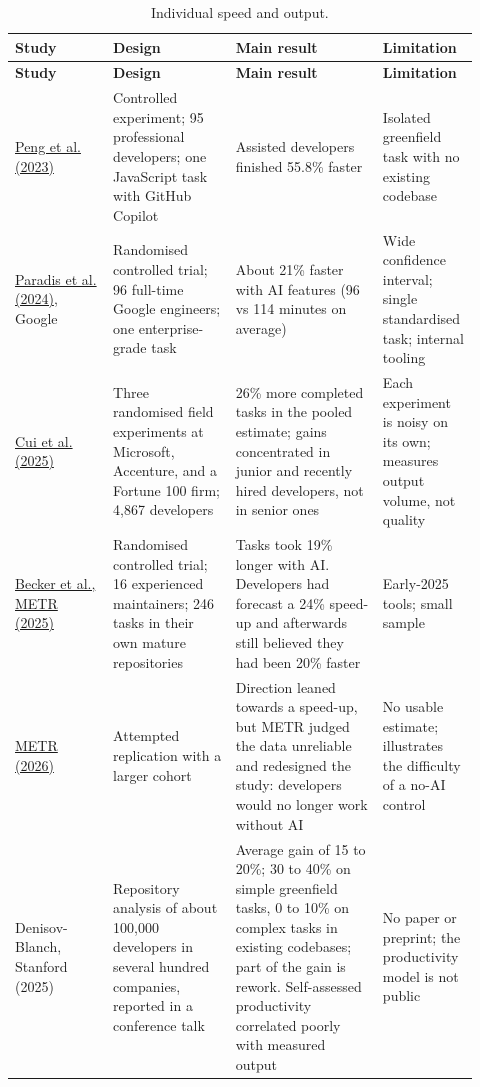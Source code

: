 \documentclass[11pt]{article}
\begin{document}
\small
\begin{longtable}{p{0.2\linewidth}p{0.25\linewidth}p{0.3\linewidth}p{0.17\linewidth}}
\caption{Individual speed and output.}\\
\toprule
\textbf{Study} & \textbf{Design} & \textbf{Main result} & \textbf{Limitation} \\
\midrule
\endfirsthead
\toprule
\textbf{Study} & \textbf{Design} & \textbf{Main result} & \textbf{Limitation} \\
\midrule
\endhead
\href{https://arxiv.org/abs/2302.06590}{Peng et al. (2023)} & Controlled experiment; 95 professional developers; one JavaScript task with GitHub Copilot & Assisted developers finished 55.8\% faster & Isolated greenfield task with no existing codebase \\
\href{https://arxiv.org/pdf/2410.12944}{Paradis et al. (2024)}, Google & Randomised controlled trial; 96 full-time Google engineers; one enterprise-grade task & About 21\% faster with AI features (96 vs 114 minutes on average) & Wide confidence interval; single standardised task; internal tooling \\
\href{https://economics.mit.edu/sites/default/files/inline-files/draft_copilot_experiments.pdf}{Cui et al. (2025)} & Three randomised field experiments at Microsoft, Accenture, and a Fortune 100 firm; 4,867 developers & 26\% more completed tasks in the pooled estimate; gains concentrated in junior and recently hired developers, not in senior ones & Each experiment is noisy on its own; measures output volume, not quality \\
\href{https://scienceblog.com/?p=582102}{Becker et al., METR (2025)} & Randomised controlled trial; 16 experienced maintainers; 246 tasks in their own mature repositories & Tasks took 19\% longer with AI. Developers had forecast a 24\% speed-up and afterwards still believed they had been 20\% faster & Early-2025 tools; small sample \\
\href{https://blog.robbowley.net/?p=3038}{METR (2026)} & Attempted replication with a larger cohort & Direction leaned towards a speed-up, but METR judged the data unreliable and redesigned the study: developers would no longer work without AI & No usable estimate; illustrates the difficulty of a no-AI control \\
Denisov-Blanch, Stanford (2025) & Repository analysis of about 100,000 developers in several hundred companies, reported in a conference talk & Average gain of 15 to 20\%; 30 to 40\% on simple greenfield tasks, 0 to 10\% on complex tasks in existing codebases; part of the gain is rework. Self-assessed productivity correlated poorly with measured output & No paper or preprint; the productivity model is not public \\
\bottomrule
\end{longtable}
\normalsize
\end{document}

